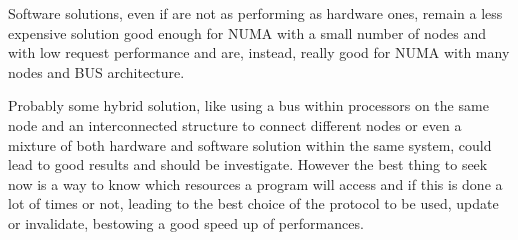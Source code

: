\documentclass[a4paper,10pt]{article}
\begin{document}
\begin{multicols}{2}
Software solutions, even if are not as performing as hardware ones, remain a less expensive solution good enough for NUMA with a small number of nodes and with low request performance and are, instead, really good for NUMA with many nodes and BUS architecture.

Probably some hybrid solution, like using a bus within processors on the same node and an interconnected structure to connect different nodes or even a mixture of both hardware and software solution within the same system, could lead to good results and should be investigate.
However the best thing to seek now is a way to know which resources a program will access and if this is done a lot of times or not, leading to the best choice of the protocol to be used, update or invalidate, bestowing a good speed up of performances.




\end{multicols}
\end{document}
